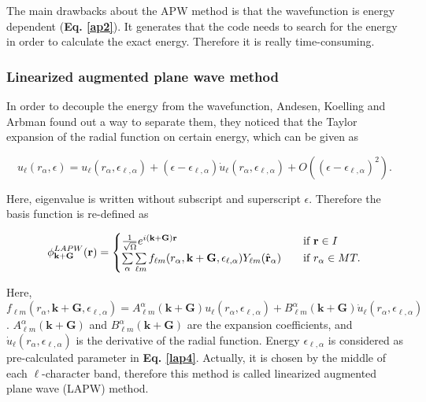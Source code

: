 \documentclass[a4paper, 12pt, titlepage,oneside,drop]{kthesis}
\begin{document}
The main drawbacks about the APW method is that the wavefunction is energy dependent (\textbf{Eq. \ref{ap2}}). It generates that
 the code needs to search for the energy in order to calculate the exact energy. Therefore it 
is really time-consuming. 

\subsubsection{Linearized augmented plane wave method}
\noindent In order to decouple the energy from the wavefunction, Andesen, Koelling and Arbman found out a way to separate them, they noticed that the Taylor expansion of the radial function
on certain energy, which can be given as

\begin{equation}\label{ap3}
 u_{{\ell}}(r_{\alpha}, \epsilon) = u_{{\ell}}(r_{\alpha}, \epsilon_{\ell,\alpha}) + (\epsilon-\epsilon_{\ell,\alpha}) \dot{u}_{{\ell}}(r_{\alpha}, \epsilon_{\ell,\alpha}) + O((\epsilon-\epsilon_{\ell,\alpha})^2).
\end{equation}

Here, eigenvalue is written without subscript and superscript $\epsilon$. Therefore the basis function is re-defined as 

\begin{equation}\label{lap4}
\phi^{LAPW}_{\textbf{k}+\textbf{G}} (\textbf{r}) = 
\begin{cases} \frac {1}{\sqrt{\Omega}} e^{i(\textbf{k}+\textbf{G})\textbf{r}} & \quad \mbox{if $\textbf{r} \in {I} $}
\\
\sumg<\alpha>\sum\limits_{{\ell}m} f_{{\ell}{m}} (r_{\alpha},\textbf{k}+\textbf{G}, \epsilon_{\ell,\alpha}) Y_{{\ell}m}(\hat{\textbf{r}}_{\alpha})  & \quad \mbox{if $r_{\alpha} \in MT. $}\\ 
\end{cases}
\end{equation}

Here, $f_{{\ell}{m}} (r_{\alpha},\textbf{k}+\textbf{G}, \epsilon_{\ell,\alpha}) =  A _{{\ell}m}^{\alpha} (\textbf {k}+\textbf{G}) u_{{\ell}}(r_{\alpha}, \epsilon_{\ell,\alpha}) + B _{{\ell}m}^{\alpha} (\textbf {k}+\textbf{G}) \dot{u}_{{\ell}}(r_{\alpha}, \epsilon_{\ell,\alpha})$
. $A _{{\ell}m}^{\alpha} (\textbf {k}+\textbf{G})$ and $B _{{\ell}m}^{\alpha} (\textbf {k}+\textbf{G})$ are the expansion coefficients, and $\dot{u}_{{\ell}}(r_{\alpha}, \epsilon_{\ell,\alpha} )$ is the derivative of the radial 
function. Energy $\epsilon_{\ell,\alpha}$  is considered as pre-calculated parameter in \textbf{Eq. \ref{lap4}}. Actually, it is chosen by the middle of  each $\ell$-character band, therefore this method is called linearized
augmented plane wave (LAPW) method.
\end{document}
